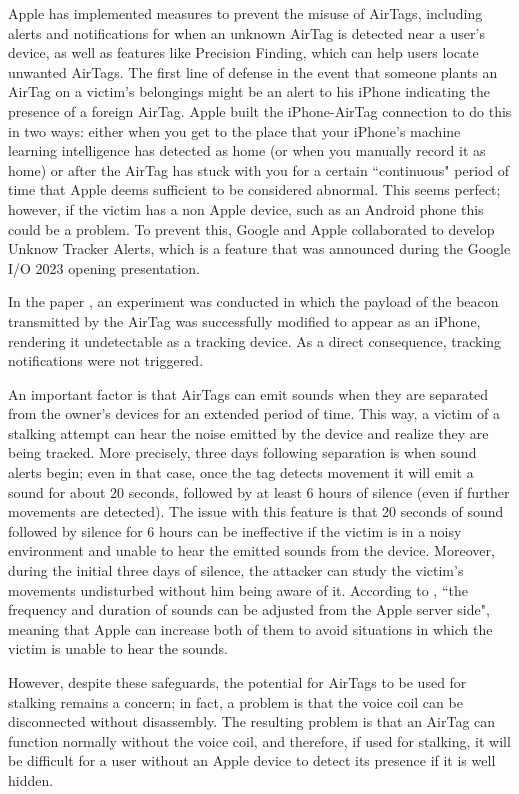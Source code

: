 \documentclass[english]{article}
\begin{document}
Apple has implemented measures to prevent the misuse of AirTags, including alerts and notifications for when an unknown AirTag is detected near a user's device, as well as features like Precision Finding, which can help users locate unwanted AirTags. The first line of defense in the event that someone plants an AirTag on a victim's belongings might be an alert to his iPhone indicating the presence of a foreign AirTag. Apple built the iPhone-AirTag connection to do this in two ways: either when you get to the place that your iPhone's machine learning intelligence has detected as home (or when you manually record it as home) or after the AirTag has stuck with you for a certain ``continuous" period of time that Apple deems sufficient to be considered abnormal. This seems perfect; however, if the victim has a non Apple device, such as an Android phone this could be a problem. To prevent this, Google and Apple collaborated to develop Unknow Tracker Alerts, which is a feature that was announced during the Google I/O 2023 opening presentation.

In the paper \cite{shafqat2023track}, an experiment was conducted in which the payload of the beacon transmitted by the AirTag was successfully modified to appear as an iPhone, rendering it undetectable as a tracking device. As a direct consequence, tracking notifications were not triggered.

An important factor is that AirTags can emit sounds when they are separated from the owner's devices for an extended period of time. This way, a victim of a stalking attempt can hear the noise emitted by the device and realize they are being tracked. More precisely, three days following separation is when sound alerts begin; even in that case, once the tag detects movement it will emit a sound for about 20 seconds, followed by at least 6 hours of silence (even if further movements are detected). The issue with this feature is that 20 seconds of sound followed by silence for 6 hours can be ineffective if the victim is in a noisy environment and unable to hear the emitted sounds from the device. Moreover, during the initial three days of silence, the attacker can study the victim's movements undisturbed without him being aware of it. According to \cite{server}, ``the frequency and duration of sounds can be adjusted from the Apple server side", meaning that Apple can increase both of them to avoid situations in which the victim is unable to hear the sounds.

However, despite these safeguards, the potential for AirTags to be used for stalking remains a concern; in fact, a problem is that the voice coil can be disconnected without disassembly. The resulting problem is that an AirTag can function normally without the voice coil, and therefore, if used for stalking, it will be difficult for a user without an Apple device to detect its presence if it is well hidden.
\end{document}
